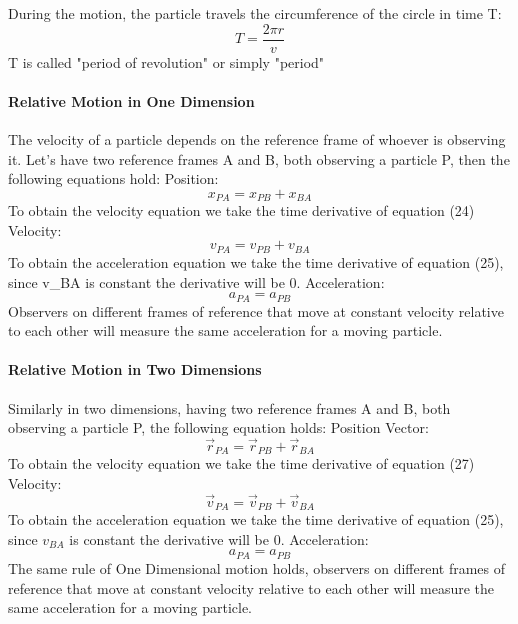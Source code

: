 \documentclass{scrartcl}
\begin{document}
    During the motion, the particle travels the circumference of the circle in time T:
    \begin{equation}
        T = \frac{2\pi r}{v}
    \end{equation}
    T is called "period of revolution" or simply "period"
    
    \paragraph{Relative Motion in One Dimension} The velocity of a particle depends on the reference frame of whoever is observing it. Let's have two reference frames A and B, both observing a particle P, then the following equations hold:
    \newline
    Position:
    \begin{equation}
        x_{PA} = x_{PB} + x_{BA}
    \end{equation}
    To obtain the velocity equation we take the time derivative of equation (24)
    \newline
    Velocity:
    \begin{equation}
        v_{PA} = v_{PB} + v_{BA}
    \end{equation}
    To obtain the acceleration equation we take the time derivative of equation (25), since v_{BA} is constant the derivative will be 0.
    \newline
    Acceleration:
    \begin{equation}
        a_{PA} = a_{PB}
    \end{equation}
    Observers on different frames of reference that move at constant velocity relative to each other will measure the same acceleration for a moving particle. 
    \paragraph{Relative Motion in Two Dimensions} Similarly in two dimensions, having two reference frames A and B, both observing a particle P, the following equation holds:
    Position Vector:
    \begin{equation}
        \vec{r}_{PA} = \vec{r}_{PB} + \vec{r}_{BA}
    \end{equation}
    To obtain the velocity equation we take the time derivative of equation (27)
    \newline
    Velocity:
    \begin{equation}
        \vec{v}_{PA} = \vec{v}_{PB} + \vec{v}_{BA}
    \end{equation}
    To obtain the acceleration equation we take the time derivative of equation (25), since $v_{BA}$ is constant the derivative will be 0.
    \newline
    Acceleration:
    \begin{equation}
        a_{PA} = a_{PB}
    \end{equation}
    The same rule of One Dimensional motion holds, observers on different frames of reference that move at constant velocity relative to each other will measure the same acceleration for a moving particle. 
\end{document}
